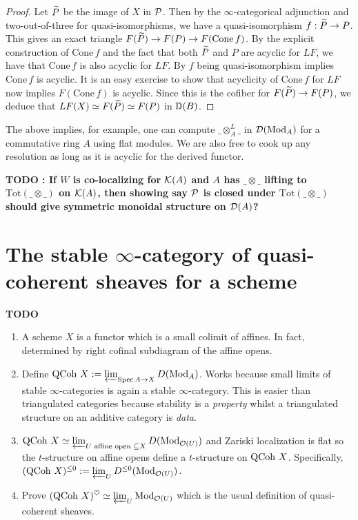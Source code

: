\documentclass{article}
\begin{document}
\begin{proof}
  Let $\widetilde{P}$ be the image of $X$ in $\mathcal{P}$.
  Then by the $\infty$-categorical adjunction
  and two-out-of-three for quasi-isomorphisms,
  we have a quasi-isomorphism $f : \widetilde{P} \to P$.
  This gives an exact triangle $F(\widetilde{P}) \to F(P) \to F(\mathrm{Cone}\,f)$.
  By the explicit construction of $\mathrm{Cone}\,f$ and
  the fact that both $\widetilde{P}$ and $P$ are acyclic for $LF$,
  we have that $\mathrm{Cone}\,f$ is also acyclic for $LF$.
  By $f$ being quasi-isomorphism implies $\mathrm{Cone}\,f$ is acyclic.
  It is an easy exercise to show that 
  acyclicity of $\mathrm{Cone}\,f$ for $LF$ now implies
  $F(\mathrm{Cone}\,f)$ is acyclic.
  Since this is the cofiber for $F(\widetilde{P}) \to F(P)$,
  we deduce that $LF(X) \simeq F(\widetilde{P}) \simeq F(P)$ in $\mathbb{D}(B)$.
\end{proof}
The above implies, for example,
one can compute $\_ \otimes_A^L \_$ in $\mathcal{D}(\mathrm{Mod}_A)$ for a commutative ring $A$
using flat modules.
We are also free to cook up any resolution as long as
it is acyclic for the derived functor.

\textbf{TODO : If $W$ is co-localizing for $\mathcal{K}(A)$
and $A$ has $\_ \otimes \_$ lifting to $\mathrm{Tot}(\_ \otimes \_)$
on $\mathcal{K}(A)$,
then showing say $\mathcal{P}$ is closed under $\mathrm{Tot(\_ \otimes \_)}$
should give symmetric monoidal structure on $\mathcal{D}(A)$?}

\section{The stable $\infty$-category of quasi-coherent sheaves for a scheme}

\textbf{TODO}
\begin{enumerate}
  \item A scheme $X$ is a functor which is a small colimit of affines.
  In fact, determined by right cofinal subdiagram of the affine opens.
  \item Define $\operatorname{QCoh}\,X := \varprojlim_{\operatorname{Spec} A \to X} D(\mathrm{Mod}_A)$.
  Works because small limits of stable $\infty$-categories is
  again a stable $\infty$-category.
  This is easier than triangulated categories 
  because stability is a \emph{property}
  whilst a triangulated structure on an additive category is \emph{data}.
  \item $\operatorname{QCoh}\,X \simeq \varprojlim_{U \text{ affine open }\subseteq X} D(\mathrm{Mod}_{\mathcal{O}(U)})$
  and Zariski localization is flat so the $t$-structure 
  on affine opens define a $t$-structure on $\operatorname{QCoh}\,X$.
  Specifically, $(\operatorname{QCoh}\,X)^{\leq 0} := \varprojlim_{U} D^{\leq 0}(\mathrm{Mod}_{\mathcal{O}(U)})$.
  \item Prove $(\operatorname{QCoh} \,X)^\heartsuit \simeq \varprojlim_{U} \mathrm{Mod}_{\mathcal{O}(U)}$
  which is the usual definition of quasi-coherent sheaves.
\end{enumerate}
\end{document}
